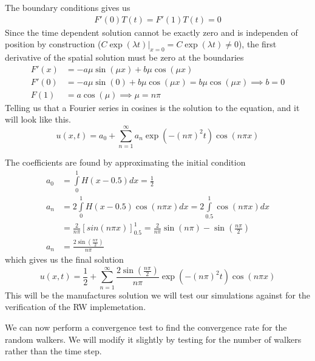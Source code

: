 The boundary conditions gives us 
\begin{align*}
 F'(0)T(t) = F'(1)T(t) = 0
\end{align*}
Since the time dependent solution cannot be exactly zero and is independen of position by construction ($C\exp(\lambda t)|_{x=0} = C\exp(\lambda t) \neq 0$), the first derivative of the spatial solution must be zero at the boundaries
\begin{align*}
 F'(x) &= -a\mu\sin(\mu x) + b\mu\cos(\mu x) \\
 F'(0) &= -a \mu\sin(0) + b\mu\cos(\mu x) = b\mu\cos(\mu x) \implies b=0 \\
 F(1) &= a\cos(\mu) \implies \mu = n\pi
\end{align*}
Telling us that a Fourier series in cosines is the solution to the equation, and it will look like this.
\begin{equation}
 u(x,t) = a_0 + \sum\limits_{n=1}^\infty a_n\exp\left(-(n\pi)^2t\right)\cos(n\pi x)
\end{equation}

The coefficients are found by approximating the initial condition
\begin{align*}
 a_0 &= \int\limits_0^1H(x-0.5)dx = \frac{1}{2} \\
 a_n &= 2\int\limits_0^1H(x-0.5)\cos(n\pi x)dx = 2\int\limits_{0.5}^1\cos(n\pi x)dx \\
 &= \frac{2}{n\pi}\left[sin(n\pi x)\right]_{0.5}^1 = \frac{2}{n\pi}\sin(n\pi) - \sin(\frac{n\pi}{2}) \\
 a_n &= \frac{2\sin(\frac{n\pi}{2})}{n\pi}
\end{align*}
which gives us the final solution
\begin{equation}
 u(x,t) = \frac{1}{2} + \sum\limits_{n=1}^\infty \frac{2\sin(\frac{n\pi}{2})}{n\pi}\exp\left(-(n\pi)^2t\right)\cos(n\pi x)
\end{equation}
This will be the manufactures solution we will test our simulations against for the verification of the RW implemetation.


We can now perform a convergence test to find the convergence rate for the random walkers.
We will modify it slightly by testing for the number of walkers rather than the time step. 


